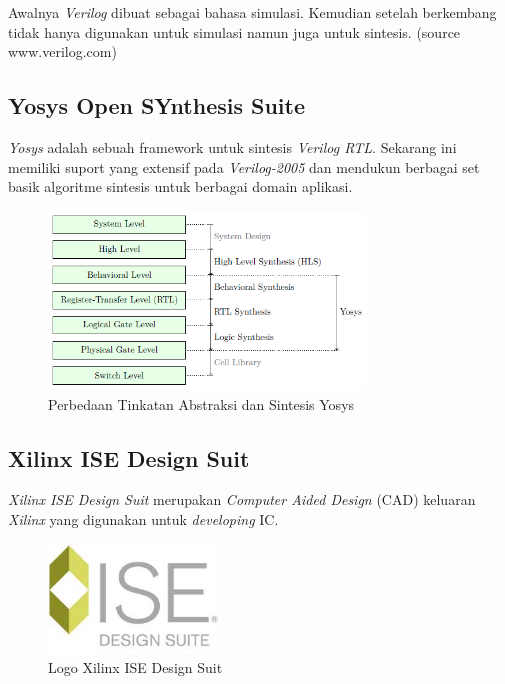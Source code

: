 Awalnya \textit{Verilog} dibuat sebagai bahasa simulasi. Kemudian setelah berkembang tidak hanya digunakan untuk simulasi namun juga untuk sintesis. (source www.verilog.com)

\subsection{Yosys Open SYnthesis Suite}
\textit{Yosys} adalah sebuah framework untuk sintesis \textit{Verilog RTL}. Sekarang ini memiliki suport yang extensif pada \textit{Verilog-2005} dan mendukun berbagai set basik algoritme sintesis untuk berbagai domain aplikasi.

\begin{figure}
	\centering
	\includegraphics[width=0.75\textwidth]
	{pics/yosys.png}
	\caption{Perbedaan Tinkatan Abstraksi dan Sintesis Yosys\cite{link.yosys}}
	\label{yosys}
\end{figure}

\subsection{Xilinx ISE Design Suit}
\textit{Xilinx ISE Design Suit} merupakan \textit{Computer Aided Design} (CAD) keluaran \textit{Xilinx} yang digunakan untuk \textit{developing} IC.

\begin{figure}
	\centering
	\includegraphics[width=0.4\textwidth]
	{pics/ise-logo.jpg}
	\caption{Logo Xilinx ISE Design Suit\cite{link.logo}}
	\label{ise}
\end{figure}

